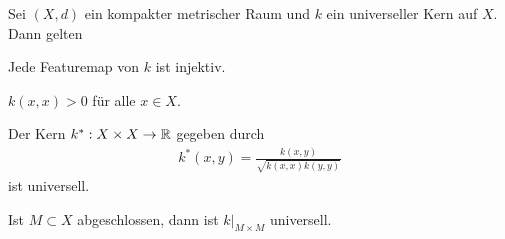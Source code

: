 \begin{lem}
\label{prop:5.4.2}
Sei $(X,d)$ ein kompakter metrischer Raum und $k$ ein universeller Kern auf $X$.
Dann gelten
\begin{propenum}
\item Jede Featuremap von $k$ ist injektiv.
\item $k(x,x) > 0$ für alle $x\in X$.
\item Der Kern $k^* : X\times X \to \mathbb{R}$ gegeben durch
\begin{align*}
k^*(x,y) = \frac{k(x,y)}{\sqrt{k(x,x)k(y,y)}}
\end{align*}
ist universell.
\item Ist $M\subset X$ abgeschlossen, dann ist $k\big|_{M\times M}$
universell.\fishhere
\end{propenum}
\end{lem}
